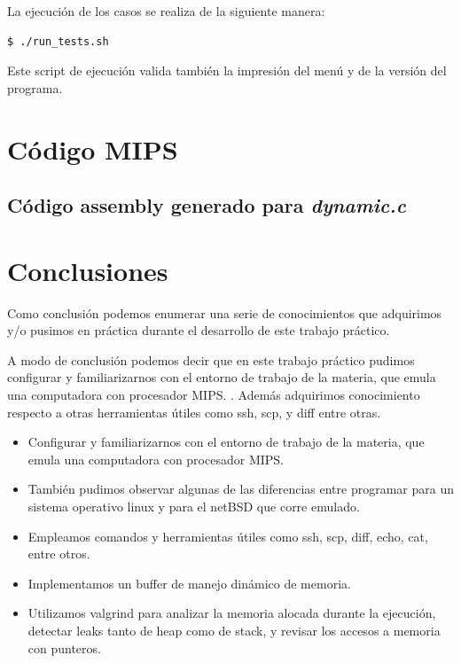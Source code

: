 \documentclass[a4paper,10pt, spanish]{article}
\begin{document}
La ejecución de los casos se realiza de la siguiente manera:

\begin{lstlisting}
$ ./run_tests.sh
\end{lstlisting}

Este script de ejecución valida también la impresión del menú y de la versión del programa.

\section{Código MIPS}

\subsection{Código assembly generado para \textit{dynamic.c}}

 

\section{Conclusiones}

Como conclusión podemos enumerar una serie de conocimientos que adquirimos y/o pusimos en práctica durante el desarrollo de este trabajo práctico.


A modo de conclusión podemos decir que en este trabajo práctico pudimos configurar y familiarizarnos con el entorno de trabajo de la materia, que emula una computadora con procesador MIPS. 
. Además adquirimos conocimiento respecto a otras herramientas útiles como ssh, scp, y diff entre otras.

\begin{itemize}
  \item Configurar y familiarizarnos con el entorno de trabajo de la materia, que emula una computadora con procesador MIPS.
	\item También pudimos observar algunas de las diferencias entre programar para un sistema operativo linux y para el netBSD que corre emulado.
	\item Empleamos comandos y herramientas útiles como ssh, scp, diff, echo, cat, entre otros.
  \item Implementamos un buffer de manejo dinámico de memoria.
  \item Utilizamos valgrind para analizar la memoria alocada durante la ejecución, detectar leaks tanto de heap como de stack, y revisar los accesos a memoria con punteros.
\end{itemize}
\end{document}
